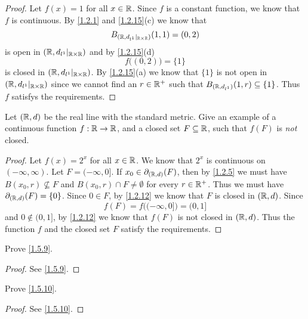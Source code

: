 \begin{proof}
  Let \(f(x) = 1\) for all \(x \in \mathbb{R}\).
  Since \(f\) is a constant function, we know that \(f\) is continuous.
  By \cref{1.2.1} and \cref{1.2.15}(c) we know that
  \[
    B_{(\mathbb{R}, d_{l^1}|_{\mathbb{R} \times \mathbb{R}})}(1, 1) = (0, 2)
  \]
  is open in \((\mathbb{R}, d_{l^1}|_{\mathbb{R} \times \mathbb{R}})\) and by \cref{1.2.15}(d)
  \[
    f\big((0, 2)\big) = \{1\}
  \]
  is closed in \((\mathbb{R}, d_{l^1}|_{\mathbb{R} \times \mathbb{R}})\).
  By \cref{1.2.15}(a) we know that \(\{1\}\) is not open in \((\mathbb{R}, d_{l^1}|_{\mathbb{R} \times \mathbb{R}})\) since we cannot find an \(r \in \mathbb{R}^+\) such that \(B_{(\mathbb{R}, d_{l^1})}(1, r) \subseteq \{1\}\).
  Thus \(f\) satisfys the requirements.
\end{proof}

\begin{ex}\label{ex:1.5.5}
  Let \((\mathbb{R}, d)\) be the real line with the standard metric.
  Give an example of a continuous function \(f : \mathbb{R} \to \mathbb{R}\), and a closed set \(F \subseteq \mathbb{R}\), such that \(f(F)\) is \emph{not} closed.
\end{ex}

\begin{proof}
  Let \(f(x) = 2^x\) for all \(x \in \mathbb{R}\).
  We know that \(2^x\) is continuous on \((-\infty, \infty)\).
  Let \(F = (-\infty, 0]\).
  If \(x_0 \in \partial_{(\mathbb{R}, d)}(F)\), then by \cref{1.2.5} we must have \(B(x_0, r) \not\subseteq F\) and \(B(x_0, r) \cap F \neq \emptyset\) for every \(r \in \mathbb{R}^+\).
  Thus we must have \(\partial_{(\mathbb{R}, d)}(F) = \{0\}\).
  Since \(0 \in F\), by \cref{1.2.12} we know that \(F\) is closed in \((\mathbb{R}, d)\).
  Since
  \[
    f(F) = f\big((-\infty, 0]\big) = (0, 1]
  \]
  and \(0 \notin (0, 1]\), by \cref{1.2.12} we know that \(f(F)\) is not closed in \((\mathbb{R}, d)\).
  Thus the function \(f\) and the closed set \(F\) satisfy the requirements.
\end{proof}

\begin{ex}\label{ex:1.5.6}
  Prove \cref{1.5.9}.
\end{ex}

\begin{proof}
  See \cref{1.5.9}.
\end{proof}

\begin{ex}\label{ex:1.5.7}
  Prove \cref{1.5.10}.
\end{ex}

\begin{proof}
  See \cref{1.5.10}.
\end{proof}

